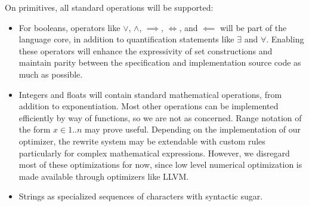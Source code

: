 \documentclass{article}
\begin{document}
On primitives, all standard operations will be supported:
\begin{itemize}
  \item For booleans, operators like $\lor$, $\land$, $\implies$, $\iff$, and $\impliedby$ will be part of the language core, in addition to quantification statements like $\exists$ and $\forall$. Enabling these operators will enhance the expressivity of set constructions and maintain parity between the specification and implementation source code as much as possible.
  \item Integers and floats will contain standard mathematical operations, from addition to exponentiation. Most other operations can be implemented efficiently by way of functions, so we are not as concerned. Range notation of the form $x \in 1..n$ may prove useful. Depending on the implementation of our optimizer, the rewrite system may be extendable with custom rules particularly for complex mathematical expressions. However, we disregard most of these optimizations for now, since low level numerical optimization is made available through optimizers like LLVM.
  \item Strings as specialized sequences of characters with syntactic sugar.
\end{itemize}
\end{document}
